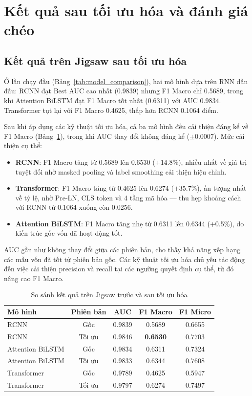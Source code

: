 \documentclass[../BTL.tex]{subfiles}
\begin{document}
\section{Kết quả sau tối ưu hóa và đánh giá chéo}

\subsection{Kết quả trên Jigsaw sau tối ưu hóa}

Ở lần chạy đầu (Bảng~\ref{tab:model_comparison}), hai mô hình dựa trên RNN dẫn đầu: RCNN đạt Best AUC cao nhất (0.9839) nhưng F1 Macro chỉ 0.5689, trong khi Attention BiLSTM đạt F1 Macro tốt nhất (0.6311) với AUC 0.9834. Transformer tụt lại với F1 Macro 0.4625, thấp hơn RCNN 0.1064 điểm.

Sau khi áp dụng các kỹ thuật tối ưu hóa, cả ba mô hình đều cải thiện đáng kể về F1 Macro (Bảng~\ref{tab:jigsaw_optimized}), trong khi AUC thay đổi không đáng kể ($\pm 0.0007$). Mức cải thiện cụ thể:

\begin{itemize}
    \item \textbf{RCNN}: F1 Macro tăng từ 0.5689 lên 0.6530 ($+$14.8\%), nhiều nhất về giá trị tuyệt đối nhờ masked pooling và label smoothing cải thiện hiệu chỉnh.
    \item \textbf{Transformer}: F1 Macro tăng từ 0.4625 lên 0.6274 ($+$35.7\%), ấn tượng nhất về tỷ lệ, nhờ Pre-LN, CLS token và 4 tầng mã hóa — thu hẹp khoảng cách với RCNN từ 0.1064 xuống còn 0.0256.
    \item \textbf{Attention BiLSTM}: F1 Macro tăng nhẹ từ 0.6311 lên 0.6344 ($+$0.5\%), do kiến trúc gốc vốn đã hoạt động tốt.
\end{itemize}

AUC gần như không thay đổi giữa các phiên bản, cho thấy khả năng xếp hạng các mẫu vốn đã tốt từ phiên bản gốc. Các kỹ thuật tối ưu hóa chủ yếu tác động đến việc cải thiện precision và recall tại các ngưỡng quyết định cụ thể, từ đó nâng cao F1 Macro.

\begin{table}[H]
\centering
\small
\begin{tabular}{|l|c|c|c|c|}
\hline
\textbf{Mô hình} & \textbf{Phiên bản} & \textbf{AUC} & \textbf{F1 Macro} & \textbf{F1 Micro} \\ \hline
RCNN & Gốc & 0.9839 & 0.5689 & 0.6655 \\ \hline
RCNN & Tối ưu & 0.9846 & \textbf{0.6530} & 0.7703 \\ \hline
Attention BiLSTM & Gốc & 0.9834 & 0.6311 & 0.7324 \\ \hline
Attention BiLSTM & Tối ưu & 0.9833 & 0.6344 & 0.7608 \\ \hline
Transformer & Gốc & 0.9789 & 0.4625 & 0.5947 \\ \hline
Transformer & Tối ưu & 0.9797 & 0.6274 & 0.7497 \\ \hline
\end{tabular}
\caption{So sánh kết quả trên Jigsaw trước và sau tối ưu hóa}
\label{tab:jigsaw_optimized}
\end{table}
\end{document}
